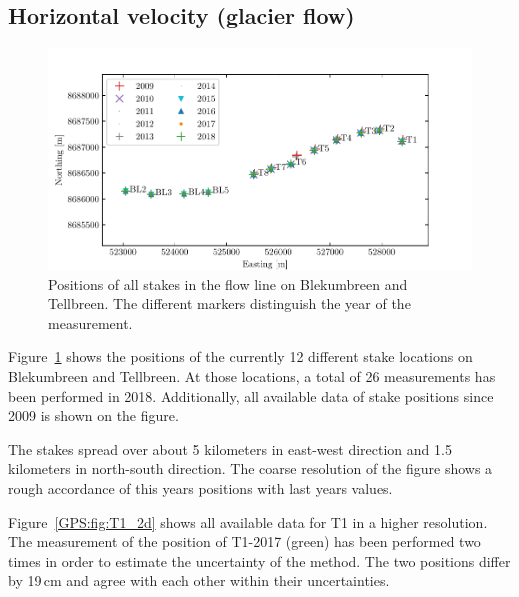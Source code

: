 \subsection{Horizontal velocity (glacier flow)}

\begin{figure}[H]
    \centering
    \includegraphics[width=\textwidth]{./figs/stakePositions.pdf}
    \caption{Positions of all stakes in the flow line on Blekumbreen and Tellbreen.
    The different markers distinguish the year of the measurement.}
    \label{GPS:fig:stakepos}
\end{figure}

Figure~\ref{GPS:fig:stakepos} shows the positions of the currently 12 different stake locations
on Blekumbreen and Tellbreen.
At those locations, a total of 26 measurements has been performed in 2018.
Additionally, all available data of stake positions since 2009 is shown on the figure.

The stakes spread over about 5 kilometers in east-west direction and 1.5 kilometers in north-south direction.
The coarse resolution of the figure shows a rough accordance of this years positions with last years values.

Figure~\ref{GPS:fig:T1_2d} shows all available data for T1 in a higher resolution.
The measurement of the position of T1-2017 (green) has been performed two times in order to estimate the uncertainty
of the method.
The two positions differ by 19\,cm and agree with each other within their uncertainties.



